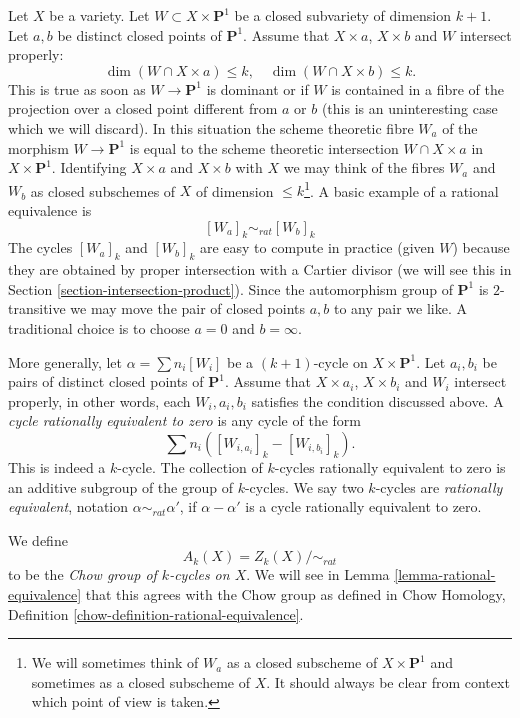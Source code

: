 \medskip\noindent
Let $X$ be a variety. Let $W \subset X \times \mathbf{P}^1$
be a closed subvariety of dimension $k + 1$. Let $a, b$ be distinct closed
points of $\mathbf{P}^1$. Assume that $X \times a$, $X \times b$ and $W$
intersect properly:
$$
\dim (W \cap X \times a) \leq k,\quad
\dim (W \cap X \times b) \leq k.
$$
This is true as soon as $W \to \mathbf{P}^1$ is dominant or if $W$ is
contained in a fibre of the projection over a closed point different from
$a$ or $b$ (this is an uninteresting case which we will discard). In this
situation the scheme theoretic fibre $W_a$ of the morphism
$W \to \mathbf{P}^1$ is equal to the scheme theoretic intersection
$W \cap X \times a$ in $X \times \mathbf{P}^1$. Identifying $X \times a$
and $X \times b$ with $X$ we may think of the fibres $W_a$ and $W_b$
as closed subschemes of $X$ of dimension $\leq k$\footnote{We will sometimes
think of $W_a$ as a closed subscheme of $X \times \mathbf{P}^1$ and sometimes
as a closed subscheme of $X$. It should always be clear from context which
point of view is taken.}. A basic example of a
rational equivalence is
$$
[W_a]_k \sim_{rat} [W_b]_k
$$
The cycles $[W_a]_k$ and $[W_b]_k$ are easy to compute in practice
(given $W$) because they are obtained by proper intersection with
a Cartier divisor (we will see this in
Section \ref{section-intersection-product}).
Since the automorphism group of $\mathbf{P}^1$ is $2$-transitive we may
move the pair of closed points $a, b$ to any pair we like. A traditional
choice is to choose $a = 0$ and $b = \infty$.

\medskip\noindent
More generally, let $\alpha = \sum n_i [W_i]$ be a $(k + 1)$-cycle on
$X \times \mathbf{P}^1$.  Let $a_i, b_i$ be pairs of distinct closed points of
$\mathbf{P}^1$. Assume that $X \times a_i$, $X \times b_i$ and $W_i$ intersect
properly, in other words, each $W_i, a_i, b_i$ satisfies the condition
discussed above. A {\it cycle rationally equivalent to zero} is any cycle
of the form
$$
\sum n_i([W_{i, a_i}]_k - [W_{i, b_i}]_k).
$$
This is indeed a $k$-cycle. The collection of $k$-cycles rationally
equivalent to zero is an additive subgroup of the group of $k$-cycles.
We say two $k$-cycles are {\it rationally equivalent}, notation
$\alpha \sim_{rat} \alpha'$, if $\alpha - \alpha'$ is a cycle rationally
equivalent to zero.

\medskip\noindent
We define
$$
A_k(X) = Z_k(X)/ \sim_{rat}
$$
to be the {\it Chow group of $k$-cycles on $X$}. We will see in
Lemma \ref{lemma-rational-equivalence}
that this agrees with the Chow group as defined in
Chow Homology, Definition \ref{chow-definition-rational-equivalence}.


